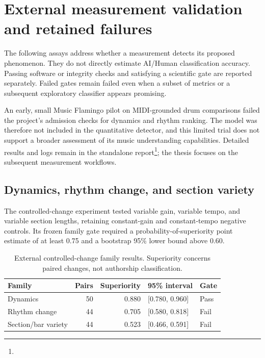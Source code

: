 \section{External measurement validation and retained failures}
\label{sec:final-external-validation}

The following assays address whether a measurement detects its proposed
phenomenon. They do not directly estimate AI/Human classification accuracy.
Passing software or integrity checks and satisfying a scientific gate are
reported separately. Failed gates remain failed even when a subset of metrics
or a subsequent exploratory classifier appears promising.

An early, small Music Flamingo pilot on MIDI-grounded drum comparisons
failed the project's admission checks for dynamics and rhythm ranking.
The model was therefore not included in the quantitative detector, and
this limited trial does not support a broader assessment of its music
understanding capabilities. Detailed results and logs remain in the
standalone report\footnote{};
the thesis focuses on the subsequent measurement workflows.

\subsection{Dynamics, rhythm change, and section variety}

The controlled-change experiment tested variable gain, variable tempo, and
variable section lengths, retaining constant-gain and constant-tempo negative
controls. Its frozen family gate required a probability-of-superiority point
estimate of at least 0.75 and a bootstrap 95\% lower bound above 0.60.

\begin{table}[htbp]
\centering\small
\caption{External controlled-change family results. Superiority concerns
paired changes, not authorship classification.}
\label{tab:external-drp}
\begin{tabular}{lrrll}
\toprule
Family & Pairs & Superiority & 95\% interval & Gate\\
\midrule
Dynamics & 50 & 0.880 & [0.780, 0.960] & Pass\\
Rhythm change & 44 & 0.705 & [0.580, 0.818] & Fail\\
Section/bar variety & 44 & 0.523 & [0.466, 0.591] & Fail\\
\bottomrule
\end{tabular}
\end{table}

